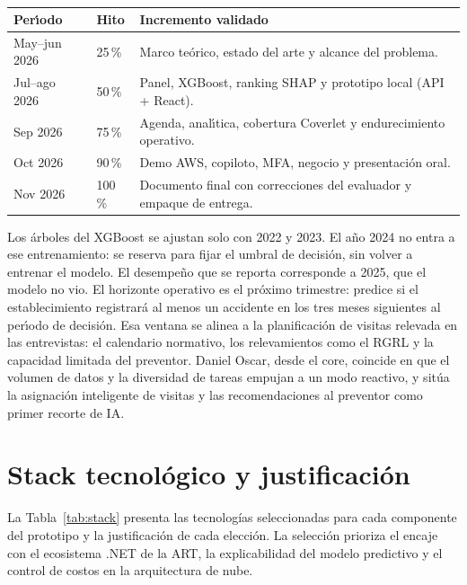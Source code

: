 \begin{table}[htbp]
	\centering
	\caption{ \fuentepropia}
	\label{tab:iteraciones-pfi}
	\small
	\begin{tabular}{@{}p{}p{}p{}@{}}
		\hline
		\textbf{Per\'{\i}odo} & \textbf{Hito} & \textbf{Incremento validado} \\
		\hline
		May--jun 2026 & 25\,\% & Marco te\'orico, estado del arte y alcance del problema. \\
		Jul--ago 2026 & 50\,\% & Panel, XGBoost, ranking SHAP y prototipo local (API + React). \\
		Sep 2026 & 75\,\% & Agenda, anal\'{\i}tica, cobertura Coverlet y endurecimiento operativo. \\
		Oct 2026 & 90\,\% & Demo AWS, copiloto, MFA, negocio y presentaci\'on oral. \\
		Nov 2026 & 100\,\% & Documento final con correcciones del evaluador y empaque de entrega. \\
		\hline
	\end{tabular}
\end{table}

Los \'arboles del XGBoost se ajustan solo con 2022 y 2023.
El a\~no 2024 no entra a ese entrenamiento: se reserva para fijar el umbral de decisi\'on, sin volver a entrenar el modelo.
El desempe\~no que se reporta corresponde a 2025, que el modelo no vio.
El horizonte operativo es el pr\'oximo trimestre: predice si el establecimiento registrar\'a al menos un accidente en los tres meses siguientes al per\'{\i}odo de decisi\'on.
Esa ventana se alinea a la planificaci\'on de visitas relevada en las entrevistas: el calendario normativo, los relevamientos como el RGRL y la capacidad limitada del preventor.
Daniel Oscar, desde el core, coincide en que el volumen de datos y la diversidad de tareas empujan a un modo reactivo, y sit\'ua la asignaci\'on inteligente de visitas y las recomendaciones al preventor como primer recorte de IA.

\section{Stack tecnol\'ogico y justificaci\'on}

La Tabla~\ref{tab:stack} presenta las tecnolog\'ias seleccionadas para cada componente del prototipo y la justificaci\'on de cada elecci\'on.
La selecci\'on prioriza el encaje con el ecosistema .NET de la ART, la explicabilidad del modelo predictivo y el control de costos en la arquitectura de nube.

